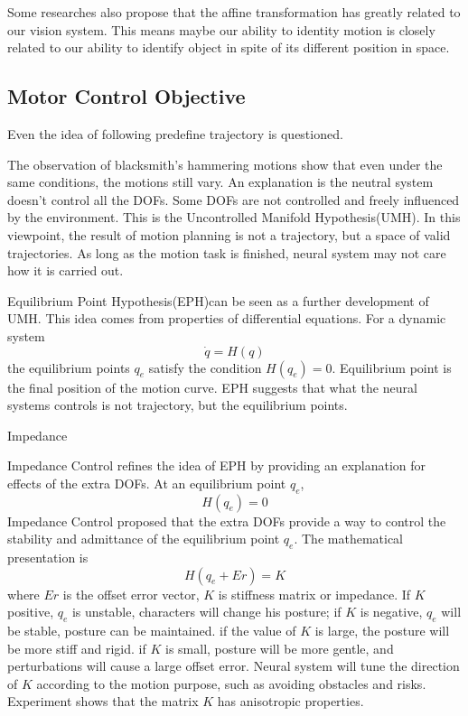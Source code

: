 Some researches also propose that the affine transformation has greatly related to our vision system. This means maybe our ability to identity motion is closely related to our ability to identify object in spite of its different position in space.



\subsection*{Motor Control Objective}
Even the idea of following predefine trajectory is questioned.

The observation of blacksmith's hammering motions show that even under the same conditions, the motions still vary. 
An explanation is the neutral system doesn't control all the DOFs. 
Some DOFs are not controlled and freely influenced by the environment. 
This is the Uncontrolled Manifold Hypothesis(UMH)\citep{latash2008neurophysiological}. 
In this viewpoint, the result of motion planning is not a trajectory, but a space of valid trajectories. As long as the motion task is finished, neural system may not care how it is carried out.



Equilibrium Point Hypothesis(EPH)\citep{Feldman1986}can be seen as a further development of UMH. 
This idea comes from properties of differential equations. 
For a dynamic system
\[
\dot{q}=H(q)
\]
the equilibrium points $q_{e}$ satisfy the condition $H(q_{e})=0$.
Equilibrium point is the final position of the motion curve.
EPH suggests that what the neural systems controls is not trajectory, but the equilibrium points.

Impedance

Impedance Control \citep{hogan1985ica} refines the idea of EPH by providing an explanation for effects of the extra DOFs. 
At an equilibrium point $q_{e}$,
\[
H(q_{e})=0 
\]
Impedance Control proposed that the extra DOFs provide a way to control the stability and admittance of the equilibrium point $q_{e}$. 
The mathematical presentation is
\begin{equation}
H(q_{e}+Er)=K
\end{equation}
where $Er$ is the offset error vector, $K$ is stiffness matrix or impedance.
If $K$ positive, $q_{e}$ is unstable, characters will change his posture;
if $K$ is negative, $q_{e}$ will be stable, posture can be maintained.
if the value of $K$ is large, the posture will be more stiff and rigid.
if $K$ is small, posture will be more gentle, and perturbations will cause a large offset error.
Neural system will tune the direction of $K$ according to the motion purpose, such as avoiding obstacles and risks. 
Experiment \citep{Franklin2007} shows that the matrix $K$ has anisotropic properties.


